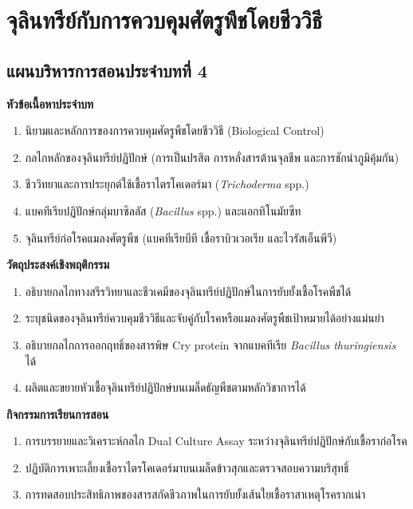 \chapter{จุลินทรีย์กับการควบคุมศัตรูพืชโดยชีววิธี}
\label{chap:ch04}

\section*{แผนบริหารการสอนประจำบทที่ 4}

\noindent\textbf{หัวข้อเนื้อหาประจำบท}
\begin{enumerate}
    \item นิยามและหลักการของการควบคุมศัตรูพืชโดยชีววิธี (Biological Control)
    \item กลไกหลักของจุลินทรีย์ปฏิปักษ์ (การเป็นปรสิต การหลั่งสารต้านจุลชีพ และการชักนำภูมิคุ้มกัน)
    \item ชีววิทยาและการประยุกต์ใช้เชื้อราไตรโคเดอร์มา (\textit{Trichoderma} spp.)
    \item แบคทีเรียปฏิปักษ์กลุ่มบาซิลลัส (\textit{Bacillus} spp.) และแอกทิโนมัยซีท
    \item จุลินทรีย์ก่อโรคแมลงศัตรูพืช (แบคทีเรียบีที เชื้อราบิวเวอเรีย และไวรัสเอ็นพีวี)
\end{enumerate}

\noindent\textbf{วัตถุประสงค์เชิงพฤติกรรม}
\begin{enumerate}
    \item อธิบายกลไกทางสรีรวิทยาและชีวเคมีของจุลินทรีย์ปฏิปักษ์ในการยับยั้งเชื้อโรคพืชได้
    \item ระบุชนิดของจุลินทรีย์ควบคุมชีววิธีและจับคู่กับโรคหรือแมลงศัตรูพืชเป้าหมายได้อย่างแม่นยำ
    \item อธิบายกลไกการออกฤทธิ์ของสารพิษ Cry protein จากแบคทีเรีย \textit{Bacillus thuringiensis} ได้
    \item ผลิตและขยายหัวเชื้อจุลินทรีย์ปฏิปักษ์บนเมล็ดธัญพืชตามหลักวิชาการได้
\end{enumerate}

\noindent\textbf{กิจกรรมการเรียนการสอน}
\begin{enumerate}
    \item การบรรยายและวิเคราะห์กลไก Dual Culture Assay ระหว่างจุลินทรีย์ปฏิปักษ์กับเชื้อราก่อโรค
    \item ปฏิบัติการเพาะเลี้ยงเชื้อราไตรโคเดอร์มาบนเมล็ดข้าวสุกและตรวจสอบความบริสุทธิ์
    \item การทดสอบประสิทธิภาพของสารสกัดชีวภาพในการยับยั้งเส้นใยเชื้อราสาเหตุโรครากเน่า
\end{enumerate}

